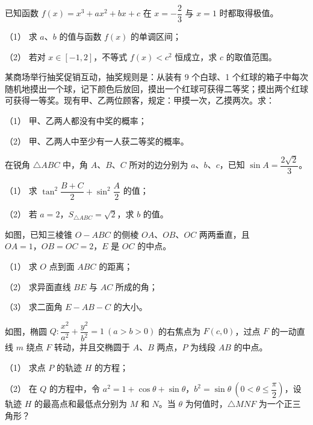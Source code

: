 \begin{question}
已知函数 $f(x)=x^3+ax^2+bx+c$ 在 $x=-\dfrac23$ 与 $x=1$ 时都取得极值。

（1） 求 $a\text{、}b$ 的值与函数 $f(x)$ 的单调区间；

（2） 若对 $x\in[-1,2]$，不等式 $f(x)<c^2$ 恒成立，求 $c$ 的取值范围。

\end{question}
\begin{question}
某商场举行抽奖促销互动，抽奖规则是：从装有 9 个白球、1 个红球的箱子中每次随机地摸出一个球，记下颜色后放回，摸出一个红球可获得二等奖；摸出两个红球可获得一等奖。现有甲、乙两位顾客，规定：甲摸一次，乙摸两次。求：

（1） 甲、乙两人都没有中奖的概率；

（2） 甲、乙两人中至少有一人获二等奖的概率。

\end{question}
\begin{question}
在锐角 $\triangle ABC$ 中，角 $A\text{、}B\text{、}C$ 所对的边分别为 $a\text{、}b\text{、}c$，已知 $\sin A=\dfrac{2\sqrt2}{3}$。

（1） 求 $\tan^2\dfrac{B+C}{2}+\sin^2\dfrac A2$ 的值；

（2） 若 $a=2\text{，}S_{\triangle ABC}=\sqrt2$，求 $b$ 的值。

\Needspace{0.4\textheight}
\end{question}
\begin{question}
如图，已知三棱锥 $O-ABC$ 的侧棱 $OA\text{、}OB\text{、}OC$ 两两垂直，且 $OA=1\text{，}OB=OC=2\text{，}E$ 是 $OC$ 的中点。

（1） 求 $O$ 点到面 $ABC$ 的距离；

（2） 求异面直线 $BE$ 与 $AC$ 所成的角；

（3） 求二面角 $E-AB-C$ 的大小。
\nopagebreak[4]
\begin{center}\end{center}
\nopagebreak[4]
\Needspace{0.4\textheight}
\end{question}
\begin{question}
如图，椭圆 $Q:\dfrac{x^2}{a^2}+\dfrac{y^2}{b^2}=1\ (a>b>0)$ 的右焦点为 $F(c,0)$，过点 $F$ 的一动直线 $m$ 绕点 $F$ 转动，并且交椭圆于 $A\text{、}B$ 两点，$P$ 为线段 $AB$ 的中点。

（1） 求点 $P$ 的轨迹 $H$ 的方程；

（2） 在 $Q$ 的方程中，令 $a^2=1+\cos\theta+\sin\theta\text{，}b^2=\sin\theta\ (0<\theta\leqslant\dfrac\pi2)$，设轨迹 $H$ 的最高点和最低点分别为 $M$ 和 $N$。当 $\theta$ 为何值时，$\triangle MNF$ 为一个正三角形？
\nopagebreak[4]
\begin{center}\end{center}
\nopagebreak[4]
\end{question}
